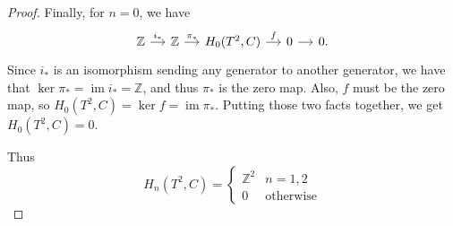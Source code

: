 \documentclass[12pt]{article}
\DeclareMathOperator{\im}{im}
\theoremstyle{definition}
\begin{document}
\begin{proof}
	Finally, for $n = 0$, we have \begin{equation*}
		\begin{tikzcd}[column sep=small]
			\mathbb{Z} \arrow[r, "i_*"] & \mathbb{Z} \arrow[r, "\pi_*"] & H_0(T^2, C) \arrow[r, "f"] & 0 \arrow[r, ""] & 0.
		\end{tikzcd}
	\end{equation*}
	Since $i_*$ is an isomorphism sending any generator to another generator, we have that $\ker\pi_* = \im i_* = \mathbb{Z}$, and thus $\pi_*$ is the zero map.
	Also, $f$ must be the zero map, so $H_0(T^2, C) = \ker f = \im \pi_*$.
	Putting those two facts together, we get $H_0(T^2, C) = 0$.

	Thus \begin{equation*}
		H_n(T^2, C) = \begin{cases}
			\mathbb{Z}^2 & n = 1, 2         \\
			0            & \text{otherwise}
		\end{cases}
	\end{equation*}
\end{proof}
\end{document}
